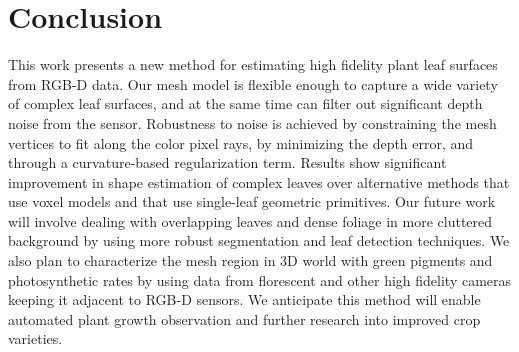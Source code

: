 \section{Conclusion}
\label{sec:conclusion}

This work presents a new method for estimating high fidelity plant leaf surfaces from RGB-D data.  Our mesh model is flexible enough to capture a wide variety of complex leaf surfaces, and at the same time can filter out significant depth noise from the sensor.  Robustness to noise is achieved by constraining the mesh vertices to fit along the color pixel rays, by minimizing the depth error, and through a curvature-based regularization term.  Results show significant improvement in shape estimation of complex leaves over alternative methods that use voxel models and that use single-leaf geometric primitives. Our future work will involve dealing with overlapping leaves and dense foliage in more cluttered background by using more robust segmentation and leaf detection techniques. We also plan to characterize the mesh region in $3$D world with green pigments and photosynthetic rates by using data from florescent and other high fidelity cameras keeping it adjacent to RGB-D sensors. We anticipate this method will enable automated plant growth observation and further research into improved crop varieties.

